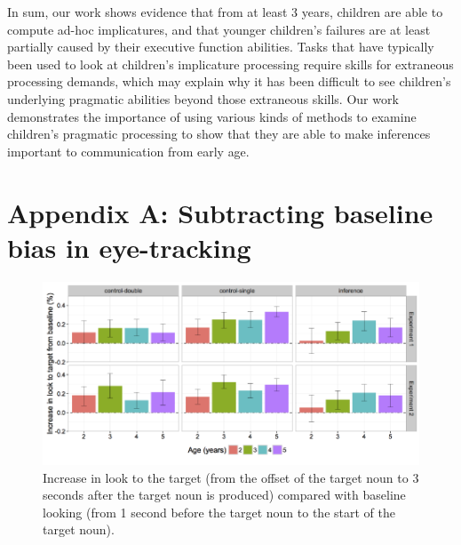 \documentclass[a4paper,man,apacite,floatsintext]{apa6}
\newenvironment{CodeChunk}{}{}
\begin{document}
In sum, our work shows evidence that from at least 3 years, children are
able to compute ad-hoc implicatures, and that younger children's
failures are at least partially caused by their executive function
abilities. Tasks that have typically been used to look at children's
implicature processing require skills for extraneous processing demands,
which may explain why it has been difficult to see children's underlying
pragmatic abilities beyond those extraneous skills. Our work
demonstrates the importance of using various kinds of methods to examine
children's pragmatic processing to show that they are able to make
inferences important to communication from early age.

\newpage

\section{Appendix A: Subtracting baseline bias in
eye-tracking}\label{appendix-a-subtracting-baseline-bias-in-eye-tracking}

\begin{CodeChunk}
\begin{figure}[H]

{\centering \includegraphics{figs/et_diff-1} 

}

\caption[Increase in look to the target (from the offset of the target noun to 3 seconds after the target noun is produced) compared with baseline looking (from 1 second before the target noun to the start of the target noun)]{Increase in look to the target (from the offset of the target noun to 3 seconds after the target noun is produced) compared with baseline looking (from 1 second before the target noun to the start of the target noun).}\label{fig:et_diff}
\end{figure}
\end{CodeChunk}
\end{document}
